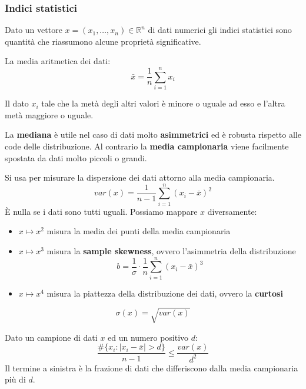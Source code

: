 \subsubsection{Indici statistici}
Dato un vettore $x=(x_1, \ldots, x_n) \in \mathbb{R}^n$ di dati numerici gli indici statistici sono quantità che riassumono alcune proprietà significative.
\begin{definition}
	La media aritmetica dei dati:
	\begin{equation}
		\bar{x} = \frac{1}{n} \sum_{i=1}^{n} x_i
	\end{equation}
\end{definition}
\begin{definition}[Mediana]
	Il dato $x_i$ tale che la metà degli altri valori è minore o uguale ad esso e l'altra metà maggiore o uguale.
\end{definition}
\begin{observation}
	La \textbf{mediana} è utile nel caso di dati molto \textbf{asimmetrici} ed è robusta rispetto alle code delle distribuzione. Al contrario la \textbf{media campionaria} viene facilmente spostata da dati molto piccoli o grandi.
\end{observation}
\begin{definition}
	Si usa per misurare la dispersione dei dati attorno alla media campionaria.
	\begin{equation}
		var(x) = \frac{1}{n-1}\sum_{i=1}^{n}(x_i - \bar{x})^2
	\end{equation}
	È nulla se i dati sono tutti uguali. Possiamo mappare $x$ diversamente:
	\begin{itemize}
		\item $x \mapsto x^2$ misura la media dei punti della media campionaria
		\item $x \mapsto x^3$ misura la \textbf{sample skewness}, ovvero l'asimmetria della distribuzione
		\begin{equation}
			b = \frac{1}{\sigma} \cdot \frac{1}{n} \sum_{i=1}^{n}(x_i-\bar{x})^3
		\end{equation}
		\item $x \mapsto x^4$ misura la piattezza della distribuzione dei dati, ovvero la \textbf{curtosi}
	\end{itemize}
\end{definition}
\begin{definition}
	\begin{equation}
		\sigma(x)=\sqrt{var(x)}
	\end{equation}
\end{definition}
\begin{proposition}
	Dato un campione di dati $x$ ed un numero positivo $d$:
	\begin{equation}
		\frac{\#\{x_i : \lvert x_i - \bar{x}\rvert > d\}}{n-1} \leq \frac{var(x)}{d^2}
	\end{equation}
	Il termine a sinistra è la frazione di dati che differiscono dalla media campionaria più di $d$.
\end{proposition}

